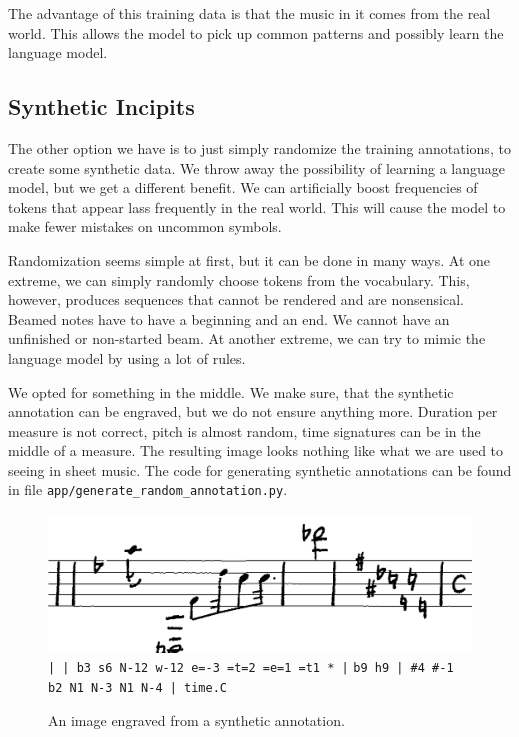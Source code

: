 The advantage of this training data is that the music in it comes from the real world. This allows the model to pick up common patterns and possibly learn the language model.


\subsection{Synthetic Incipits}

The other option we have is to just simply randomize the training annotations, to create some synthetic data. We throw away the possibility of learning a language model, but we get a different benefit. We can artificially boost frequencies of tokens that appear lass frequently in the real world. This will cause the model to make fewer mistakes on uncommon symbols.

Randomization seems simple at first, but it can be done in many ways. At one extreme, we can simply randomly choose tokens from the vocabulary. This, however, produces sequences that cannot be rendered and are nonsensical. Beamed notes have to have a beginning and an end. We cannot have an unfinished or non-started beam. At another extreme, we can try to mimic the language model by using a lot of rules.

We opted for something in the middle. We make sure, that the synthetic annotation can be engraved, but we do not ensure anything more. Duration per measure is not correct, pitch is almost random, time signatures can be in the middle of a measure. The resulting image looks nothing like what we are used to seeing in sheet music. The code for generating synthetic annotations can be found in file \verb`app/`\allowbreak\verb`generate_`\allowbreak\verb`random_`\allowbreak\verb`annotation.py`.

\begin{figure}[h]
    \centering
    \includegraphics[width=140mm]{../img/synthetic-incipit}
    \verb`| | b3 s6 N-12 w-12 e=-3 =t=2 =e=1 =t1 * |`
    \verb`b9 h9 | #4 #-1 b2 N1 N-3 N1 N-4 | time.C`
    \caption{An image engraved from a synthetic annotation.}
    \label{fig6:SyntheticIncipit}
\end{figure}

